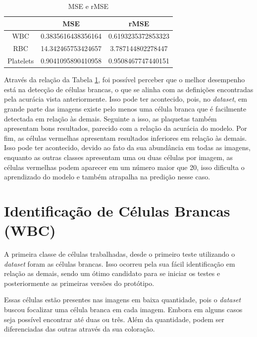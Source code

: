 \begin{table}[!htb]
	\centering
	\caption{MSE e rMSE}
	\label{tbl:mse}
	\begin{tabular}{|c|c|c|}
		\hline
		          & MSE                & rMSE               \\ \hline
		WBC       & 0.3835616438356164 & 0.6193235372853323 \\ \hline
		RBC       & 14.342465753424657 & 3.787144802278447  \\ \hline
		Platelets & 0.9041095890410958 & 0.9508467747440151 \\ \hline
	\end{tabular}
	\vspace{6pt}
\end{table}

Através da relação da Tabela \ref{tbl:mse}, foi possível perceber que o melhor desempenho está na detecção de células brancas, o que se alinha com as definições encontradas pela acurácia vista anteriormente. Isso pode ter acontecido, pois, no \emph{dataset}, em grande parte das imagens existe pelo menos uma célula branca que é facilmente detectada em relação às demais. Seguinte a isso, as plaquetas também apresentam bons resultados, parecido com a relação da acurácia do modelo. Por fim, as células vermelhas apresentam resultados inferiores em relação às demais. Isso pode ter acontecido, devido ao fato da sua abundância em todas as imagens, enquanto as outras classes apresentam uma ou duas células por imagem, as células vermelhas podem aparecer em um número maior que 20, isso dificulta o aprendizado do modelo e também atrapalha na predição nesse caso.

\section{Identificação de Células Brancas (WBC)}
A primeira classe de células trabalhadas, desde o primeiro teste utilizando o \emph{dataset} foram as células brancas. Isso ocorreu pela sua fácil identificação em relação as demais, sendo um ótimo candidato para se iniciar os testes e posteriormente as primeiras versões do protótipo.

Essas células estão presentes nas imagens em baixa quantidade, pois o \emph{dataset} buscou focalizar uma célula branca em cada imagem. Embora em alguns casos seja possível encontrar até duas ou três. Além da quantidade, podem ser diferenciadas das outras através da sua coloração.

